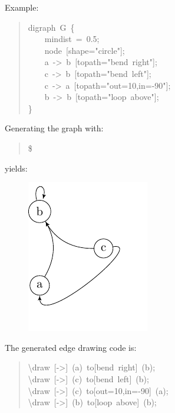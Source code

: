 \documentclass[10pt,a4paper,english]{article}
\newlength{\admonitionwidth}
\begin{document}
Example:
\begin{quote}{\ttfamily \raggedright \noindent
digraph~G~{\{}~\\
~~~~mindist~=~0.5;~\\
~~~~node~{[}shape="circle"{]};~\\
~~~~a~->~b~{[}topath="bend~right"{]};~\\
~~~~c~->~b~{[}topath="bend~left"{]};~\\
~~~~c~->~a~{[}topath="out=10,in=-90"{]};~\\
~~~~b~->~b~{[}topath="loop~above"{]};~\\
{\}}
}\end{quote}

Generating the graph with:
\begin{quote}{\ttfamily \raggedright \noindent
{\$}~
}\end{quote}

yields:
\begin{figure}[H]
\centering

\includegraphics{pdf/topaths1}
\end{figure}

The generated edge drawing code is:
\begin{quote}{\ttfamily \raggedright \noindent
{\textbackslash}draw~{[}->{]}~(a)~to{[}bend~right{]}~(b);~\\
{\textbackslash}draw~{[}->{]}~(c)~to{[}bend~left{]}~(b);~\\
{\textbackslash}draw~{[}->{]}~(c)~to{[}out=10,in=-90{]}~(a);~\\
{\textbackslash}draw~{[}->{]}~(b)~to{[}loop~above{]}~(b);
}\end{quote}
\begin{center}\begin{sffamily}
\end{sffamily}
\end{center}
\end{document}
